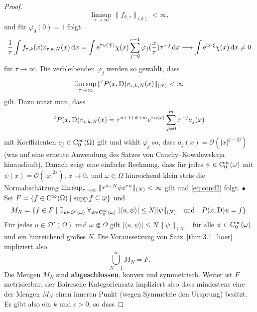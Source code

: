 \begin{proof}
\begin{equation}\label{eq:cond1}
    \limsup_{\tau\to\infty} \| f_{k,\tau}\|_{(k)} < \infty,
\end{equation}
und für $\varphi_0(0)=1$ folgt
\begin{equation}\label{eq:cond3}
   \frac1\tau \int f_{\tau,k}(x) v_{\tau,k,N}(x)\,\mathrm d x = \int \mathrm e^{\tau u(\frac x\tau)} \chi(x) \sum_{j=0}^{r-1} \varphi_j(\frac x\tau) \tau^{-j} \,\mathrm d x \longrightarrow \int \mathrm e^{\mathrm i x\cdot\xi}\chi(x)\,\mathrm d x\ne0
\end{equation}
für $\tau\to\infty$. Die verbleibenden $\varphi_j$ werden so gewählt, dass 
\begin{equation}\label{eq:cond2}
   \limsup_{\tau\to\infty} \|{}^tP(x,\mathrm D) v_{\tau,k,N}(x)\|_{(N)} <\infty 
\end{equation}
gilt. Dazu nutzt man, dass 
\begin{equation}
{}^tP(x,\mathrm D) v_{\tau,k,N}(x)=\tau^{n+1+k+m}  \mathrm e^{\tau u(x)} \sum_{j=0}^m \tau^{-j} a_j(x) 
\end{equation}
mit Koeffizienten $c_j\in\mathrm C_0^\infty(\Omega)$ gilt und wählt $\varphi_j$ so, dass $a_j(x)=\mathcal O(|x|^{q-2j})$ (was auf eine erneute Anwendung des Satzes von Cauchy--Kowalewskaja hinausläuft). Danach zeigt eine einfache Rechnung, dass für jedes $\psi\in\mathrm C_0^\infty(\omega)$ mit $\psi(x)=\mathcal O(|x|^{2s})$, $x\to0$,
und $\omega\Subset\Omega$ hinreichend klein stets die Normabschätzung $\limsup_{\tau\to\infty} \|\tau^{s-N}\psi \mathrm e^{\tau u}\|_{(N)}<\infty$ gilt und \eqref{eq:cond2} folgt. 
$\bullet$  Sei $F=\{f\in\mathrm C^\infty(\Omega) \mid \operatorname{supp} f\subseteq\overline\omega\}$ und 
\begin{equation}
   M_N = \{ f\in F\mid \exists_{u\in\mathscr D'(\omega)} \; \forall_{\psi\in\mathrm C_0^\infty(\omega)}\; |\langle u,\psi\rangle | \le N \|\psi\|_{(N)} \quad\text{und}\quad P(x,\mathrm D)u=f \}.
\end{equation}
Für jedes $u\in\mathscr D'(\Omega)$ und $\omega\Subset\Omega$ gilt $ |\langle u,\psi\rangle | \le N \|\psi\|_{(N)}$ für alle $\psi\in\mathrm C_0^\infty(\omega)$ und ein hinreichend großes $N$. Die Voraussetzung von Satz~\ref{thm:3.1_hoer} 
impliziert also
\begin{equation}
   \bigcup_{N=1}^\infty M_N = F.
\end{equation} 
Die Mengen $M_N$ sind {\bf abgeschlossen},  konvex und symmetrisch. Weiter ist $F$ metrisierbar, der Bairesche Kategoriensatz impliziert also dass mindestens eine der Mengen $M_N$ einen inneren Punkt (wegen Symmetrie den Ursprung) besitzt. Es gibt also ein $k$ und $\epsilon>0$, so dass

\end{proof}
